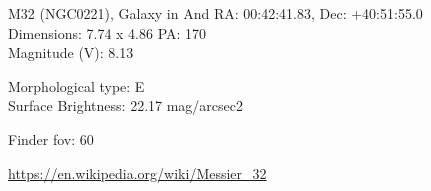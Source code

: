 \begin{block}{M32 (NGC0221), Galaxy in And}
    RA: 00:42:41.83, Dec: +40:51:55.0 \\ 
    Dimensions: 7.74 x 4.86 PA: 170 \\ 
    Magnitude (V): 8.13

    Morphological type: E \\ 
    Surface Brightness: 22.17 mag/arcsec2 


    Finder fov: 60 

    \url{https://en.wikipedia.org/wiki/Messier_32} 
\end{block}